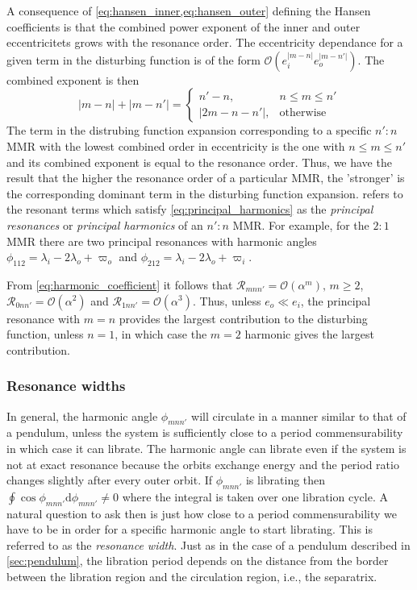 \documentclass[twoside,openright,titlepage,numbers=noenddot,headinclude,%
                footinclude=true,cleardoublepage=empty,abstractoff, 
                BCOR=5mm,paper=a4,fontsize=11pt,%
                american,%
                ]{scrreprt}%
\begin{document}
A consequence of \cref{eq:hansen_inner,eq:hansen_outer}
defining the Hansen coefficients
is that the combined power exponent of the inner and outer 
eccentricitets 
grows with the resonance order. The eccentricity dependance
for a given term in the disturbing function 
is of the form $\mathcal{O}(e_i^{\lvert m-n\rvert}
e_o^{\lvert m-n'\rvert})$. The combined exponent is then
\begin{equation}
    \lvert m-n\rvert+\lvert m-n'\rvert=
    \begin{cases}
        n'-n, & n\leq m\leq n'\\
        \lvert 2m-n-n'\rvert, & \text{otherwise}
    \end{cases}
    \label{eq:principal_harmonics}
\end{equation}
The term in the distrubing function expansion corresponding
to a specific $n':n$ MMR with the lowest combined order
in eccentricity is the one with $n\leq m\leq n'$ and its
combined exponent is equal to the resonance order. Thus, we
have the result that the higher the resonance order of
a particular MMR, the 'stronger' is the corresponding dominant
term in the disturbing function expansion. \Cite{Mardling2013}
refers to the resonant terms which satisfy \cref{eq:principal_harmonics}
as the
\emph{principal resonances} or \emph{principal harmonics} 
of an $n':n$ MMR. For example, for the $2:1$ MMR there are two
principal resonances with harmonic angles $\phi_{112}=
\lambda_i-2\lambda_o+\varpi_o$ and $\phi_{212}=\lambda_i
-2\lambda_o+\varpi_i$.

From \cref{eq:harmonic_coefficient} it follows that $\mathcal{R}
_{mnn'}=\mathcal{O}(\alpha^m),\,m\geq 2$, $\mathcal{R}_{0nn'}=
\mathcal{O}(\alpha^2)$ and $\mathcal{R}_{1nn'}=\mathcal{O}(
\alpha^3)$. Thus, unless $e_o\ll e_i$, the principal resonance
with $m=n$ provides the largest contribution to the disturbing
function, unless $n=1$, in which case the $m=2$ harmonic 
gives the largest contribution.
\subsubsection{Resonance widths}
\label{ssub:Resonance_widths}
In general, the harmonic angle $\phi_{mnn'}$ will circulate in a
manner similar to that of a pendulum, unless the system is 
sufficiently close to a period commensurability in which case
it can librate. The harmonic angle
can librate even if the system is not at exact resonance
because the orbits exchange energy and the period ratio changes
slightly after every outer orbit. If $\phi_{mnn'}$ is librating
 then $\oint\cos\phi_{mnn'}\mathrm{d}\phi_{mnn'}\neq 0$ where the
integral is taken over one libration cycle. A natural 
question to ask then is just how close to a period commensurability
we have to be in order for a specific harmonic angle to start
librating. This is referred to as the \emph{resonance width}.
Just as in the case of a pendulum described in 
\cref{sec:pendulum}, the libration period 
depends on the distance from the border between the libration region
and the circulation region, i.e., the separatrix.  
\end{document}
